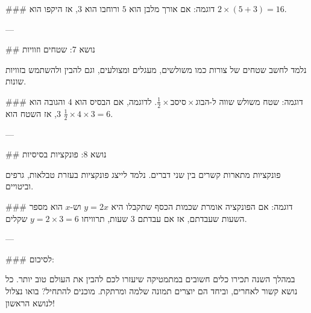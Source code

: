 ### דוגמה:
אם אורך מלבן הוא $5$ ורוחבו הוא $3$, אז היקפו הוא $2 \times (5 + 3) = 16$.

---

## נושא 7: שטחים וזוויות

נלמד לחשב שטחים של צורות כמו משולשים, מעגלים ומצולעים, וגם להבין ולהשתמש בזוויות שונות.

### דוגמה:
שטח משולש שווה ל-$\frac{1}{2} \times בסיס \times גובה$. לדוגמה, אם הבסיס הוא $4$ והגובה הוא $3$, אז השטח הוא $\frac{1}{2} \times 4 \times 3 = 6$.

---

## נושא 8: פונקציות בסיסיות

פונקציות מתארות קשרים בין שני דברים. נלמד לייצג פונקציות בעזרת טבלאות, גרפים וביטויים.

### דוגמה:
אם הפונקציה אומרת שכמות הכסף שתקבלו היא $y = 2x$ וש-$x$ הוא מספר השעות שעבדתם, אז אם עבדתם 3 שעות, תרוויחו $y = 2 \times 3 = 6$ שקלים.

---

### לסיכום:

במהלך השנה תכירו כלים חשובים במתמטיקה שיעזרו לכם להבין את העולם טוב יותר. כל נושא קשור לאחרים, וביחד הם יוצרים תמונה שלמה ומרתקת. מוכנים להתחיל? בואו נצלול לנושא הראשון!

